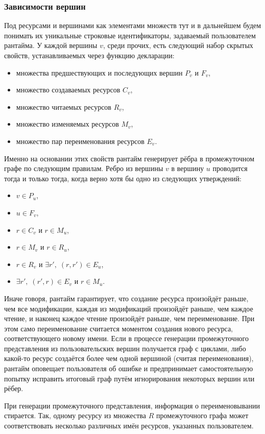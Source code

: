 \subsubsection{Зависимости вершин}
Под ресурсами и вершинами как элементами множеств тут и в дальнейшем будем понимать их уникальные строковые идентификаторы, задаваемый пользователем рантайма.
У каждой вершины $v$, среди прочих, есть следующий набор скрытых свойств, устанавливаемых через функцию декларации:
\begin{itemize}
    \item множества предшествующих и последующих вершин $P_v$ и $F_v$,
    \item множество создаваемых ресурсов $C_v$,
    \item множество читаемых ресурсов $R_v$,
    \item множество изменяемых ресурсов $M_v$,
    \item множество пар переименования ресурсов $E_v$.
\end{itemize}
Именно на основании этих свойств рантайм генерирует рёбра в промежуточном графе по следующим правилам.
Ребро из вершины $v$ в вершину $u$ проводится тогда и только тогда, когда верно хотя бы одно из следующих утверждений:
\begin{itemize}
    \item $v\in P_u$,
    \item $u\in F_v$,
    \item $r \in C_v$ и $r \in M_u$,
    \item $r \in M_v$ и $r \in R_u$,
    \item $r \in R_v$ и $\exists r',\;(r, r') \in E_u$,
    \item $\exists r',\;(r', r) \in E_v$ и $r \in M_u$.
\end{itemize}
Иначе говоря, рантайм гарантирует, что создание ресурса произойдёт раньше, чем все модификации, каждая из модификаций произойдёт раньше, чем каждое чтение, и наконец каждое чтение произойдёт раньше, чем переименование.
При этом само переименование считается моментом создания нового ресурса, соответствующего новому имени.
Если в процессе генерации промежуточного представления из пользовательских вершин получается граф с циклами, либо какой-то ресурс создаётся более чем одной вершиной (считая переименования), рантайм оповещает пользователя об ошибке и предпринимает самостоятельную попытку исправить итоговый граф путём игнорирования некоторых вершин или рёбер.

При генерации промежуточного представления, информация о переименовывании стирается.
Так, одному ресурсу из множества $R$ промежуточного графа может соответствовать несколько различных имён ресурсов, указанных пользователем.

